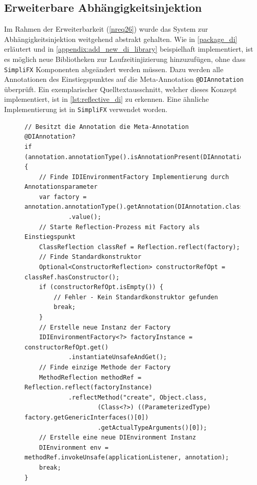 \subsection{Erweiterbare Abhängigkeitsinjektion}
Im Rahmen der Erweiterbarkeit (\autoref{nreq26}) wurde das System zur Abhängigkeitsinjektion weitgehend abstrakt gehalten. Wie in \autoref{package_di} erläutert und in \autoref{appendix:add_new_di_library} beispielhaft implementiert, ist es möglich neue Bibliotheken zur Laufzeitinjizierung hinzuzufügen, ohne dass \texttt{SimpliFX} Komponenten abgeändert werden müssen. Dazu werden alle Annotationen des Einstiegspunktes auf die Meta-Annotation \texttt{@DIAnnotation} überprüft. Ein exemplarischer Quelltextausschnitt, welcher dieses Konzept implementiert, ist in \autoref{lst:reflective_di} zu erkennen. Eine ähnliche Implementierung ist in \texttt{SimpliFX} verwendet worden.
\begin{figure}[H]
	\centering
	\begin{lstlisting}[caption=Implementierung -- Abhängigkeitsinjektion., captionpos=b, label=lst:reflective_di, basicstyle={\scriptsize\ttfamily}]
// Besitzt die Annotation die Meta-Annotation @DIAnnotation?
if (annotation.annotationType().isAnnotationPresent(DIAnnotation.class)) {
	// Finde IDIEnvironmentFactory Implementierung durch Annotationsparameter
	var factory = annotation.annotationType().getAnnotation(DIAnnotation.class)
			.value();
	// Starte Reflection-Prozess mit Factory als Einstiegspunkt
	ClassReflection classRef = Reflection.reflect(factory);
	// Finde Standardkonstruktor
	Optional<ConstructorReflection> constructorRefOpt = classRef.hasConstructor();
	if (constructorRefOpt.isEmpty()) {
		// Fehler - Kein Standardkonstruktor gefunden
		break;
	}
	// Erstelle neue Instanz der Factory
	IDIEnvironmentFactory<?> factoryInstance = constructorRefOpt.get()
			.instantiateUnsafeAndGet();
	// Finde einzige Methode der Factory
	MethodReflection methodRef = Reflection.reflect(factoryInstance)
			.reflectMethod("create", Object.class, 
					(Class<?>) ((ParameterizedType) factory.getGenericInterfaces()[0])
					.getActualTypeArguments()[0]);
	// Erstelle eine neue DIEnvironment Instanz
	DIEnvironment env = methodRef.invokeUnsafe(applicationListener, annotation);
	break;
}
	\end{lstlisting}
\end{figure}